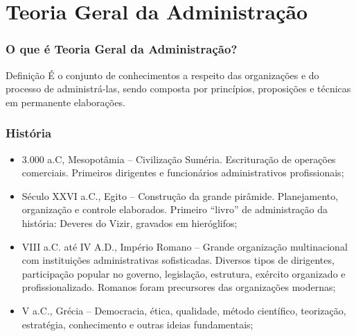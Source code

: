 \documentclass[aspectratio=169]{beamer}
\begin{document}

\section{Teoria Geral da Administra\c cão}

\begin{frame}
	\frametitle{O que é Teoria Geral da Administra\c cão?}

	\begin{block}{Defini\c cão}
	É o conjunto de conhecimentos a respeito das organiza\c cões e do processo de administrá-las, sendo composta por princípios, proposi\c cões e técnicas em permanente elabora\c cões.
	\end{block}
\end{frame}

\begin{frame}
	\frametitle{História}

	\begin{itemize}
		\item 3.000 a.C, Mesopotâmia -- Civiliza\c cão Suméria. Escritura\c cão de opera\c cões comerciais. Primeiros dirigentes e funcionários administrativos profissionais; 
		\item Século XXVI a.C., Egito -- Constru\c cão da grande pirâmide. Planejamento, organiza\c cão e controle elaborados. Primeiro ``livro'' de administra\c cão da história: Deveres do Vizir, gravados em hieróglifos;
		\item VIII a.C. até IV A.D., Império Romano -- Grande organiza\c cão multinacional com institui\c cões administrativas sofisticadas. Diversos tipos de dirigentes, participa\c cão popular no governo, legisla\c cão, estrutura, exército organizado e profissionalizado. Romanos foram precursores das organiza\c cões modernas;
		\item V a.C., Grécia -- Democracia, ética, qualidade, método científico, teoriza\c cão, estratégia, conhecimento e outras ideias fundamentais;
	\end{itemize}
\end{frame}
\end{document}
